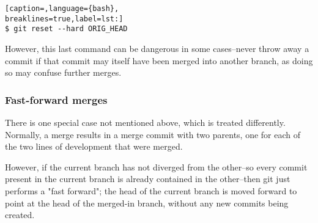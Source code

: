 \lstset{basicstyle=\scriptsize, numbers=none, captionpos=b, tabsize=4}
\begin{lstlisting}[caption=,language={bash},
breaklines=true,label=lst:]
$ git reset --hard ORIG_HEAD
\end{lstlisting}

However, this last command can be dangerous in some cases--never throw away a
commit if that commit may itself have been merged into another branch, as doing
so may confuse further merges.

\subsubsection{Fast-forward merges}
There is one special case not mentioned above, which is treated differently.
Normally, a merge results in a merge commit with two parents, one for each of
the two lines of development that were merged.

However, if the current branch has not diverged from the other--so every commit
present in the current branch is already contained in the other--then git just
performs a "fast forward"; the head of the current branch is moved forward to
point at the head of the merged-in branch, without any new commits being
created.
